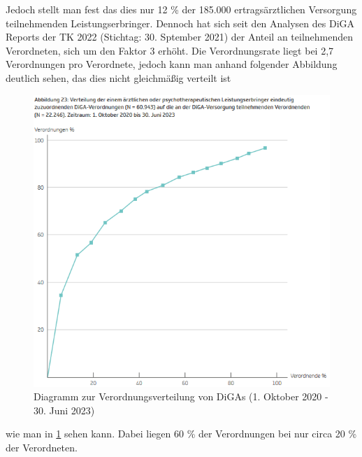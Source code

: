 \documentclass{article}
\begin{document}
			Jedoch stellt man fest das dies nur 12 \% der 185.000 ertragsärztlichen Versorgung teilnehmenden Leistungserbringer. Dennoch hat sich seit den Analysen des DiGA Reports der TK 2022 (Stichtag: 30. Sptember 2021) der Anteil an teilnehmenden Verordneten, sich um den Faktor 3 erhöht. Die Verordnungsrate liegt bei 2,7 Verordnungen pro Verordnete, jedoch kann man anhand folgender Abbildung deutlich sehen, das dies nicht gleichmäßig verteilt ist
			\begin{figure}[hbtp]
				\includegraphics[width=\textwidth]{./grafiken/abbildung_verordnungen_pro_verordneten_diga}
				\caption[Verordnungsverteilung (1. Oktober 2020 - 30. Juni 2023)]{Diagramm zur Verordnungsverteilung von DiGAs (1. Oktober 2020 - 30. Juni 2023)}
				\label{Abb-verordnungen-diga}
			\end{figure}
			wie man in \ref{Abb-verordnungen-diga} sehen kann. Dabei liegen 60 \% der Verordnungen bei nur circa 20 \% der Verordneten. 
			
				 


\end{document}
